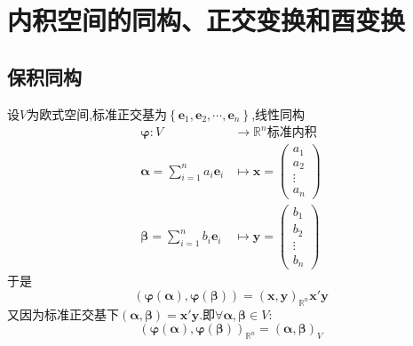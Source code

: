 \section{内积空间的同构、正交变换和酉变换}
\subsection{保积同构}
设$V$为欧式空间,标准正交基为$\left\{
    \bm{e}_1,\bm{e}_2,\cdots,\bm{e}_n
    \right\}$,线性同构\begin{align*}
        \bm{\varphi}:V&\longrightarrow\mathbb{R}^n\text{标准内积}\\
        \bm{\alpha}=\sum_{i=1}^{n}a_i\bm{e}_i&\longmapsto\bm{x}=\begin{pmatrix}
            a_1\\a_2\\\vdots\\a_n
        \end{pmatrix}\\
        \bm{\beta}=\sum_{i=1}^{n}b_i\bm{e}_i&\longmapsto\bm{y}=\begin{pmatrix}
            b_1\\b_2\\\vdots\\b_n
        \end{pmatrix}
    \end{align*}于是\[
    \left(
        \bm{\varphi}\left(\bm{\alpha}\right),\bm{\varphi}\left(\bm{\beta}\right)
    \right)=\left(
        \bm{x},\bm{y}
    \right)_{\mathbb{R}^n}\bm{x}'\bm{y}
    \]又因为标准正交基下$\left(
        \bm{\alpha},\bm{\beta}
    \right)=\bm{x}'\bm{y}$.即$\forall\bm{\alpha},\bm{\beta}\in V:$\[
    \left(
        \bm{\varphi}\left(\bm{\alpha}\right),\bm{\varphi}\left(\bm{\beta}\right)
    \right)_{\mathbb{R}^n}=\left(
        \bm{\alpha},\bm{\beta}
    \right)_V
    \]

